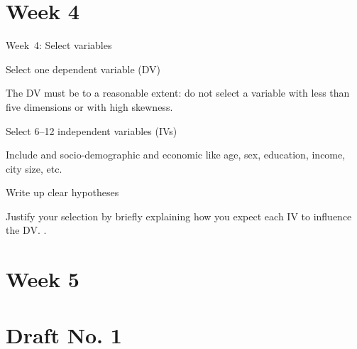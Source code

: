 \documentclass[t]{beamer}
\begin{document}
    \section*{Week 4}

	\begin{frame}[c]{Week~4: Select variables}
		
		\begin{block}{Select one dependent variable (DV)}

			The DV must be  to a reasonable extent: do not select a variable with less than five dimensions or with high skewness.

		\end{block}

		\begin{block}{Select 6--12 independent variables (IVs)}

			Include  and socio-demographic and economic  like age, sex, education, income, city size, etc.

		\end{block}

		\begin{alertblock}{Write up clear hypotheses}

			Justify your selection by briefly explaining how you expect each IV to influence the DV. .

		\end{alertblock}
				
	\end{frame}


    \section*{Week 5}

	\section{Draft No. 1}
\end{document}
